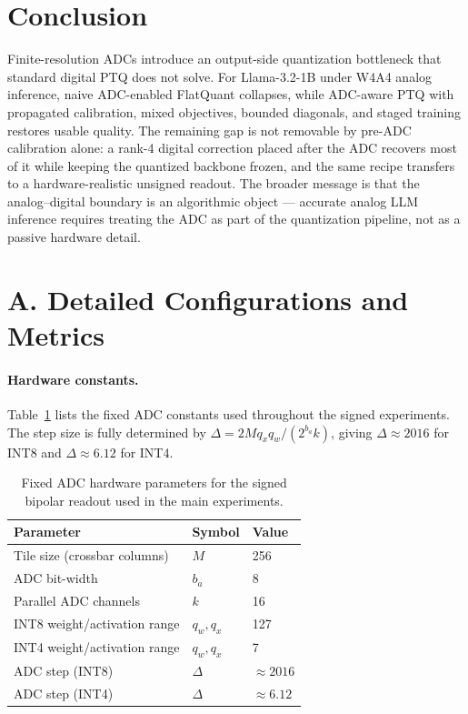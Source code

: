 \documentclass[letterpaper]{article} %
\theoremstyle{plain}
\begin{document}
\section{Conclusion}

Finite-resolution ADCs introduce an output-side quantization bottleneck that standard digital PTQ does not solve. For Llama-3.2-1B under W4A4 analog inference, naive ADC-enabled FlatQuant collapses, while ADC-aware PTQ with propagated calibration, mixed objectives, bounded diagonals, and staged training restores usable quality. The remaining gap is not removable by pre-ADC calibration alone: a rank-4 digital correction placed after the ADC recovers most of it while keeping the quantized backbone frozen, and the same recipe transfers to a hardware-realistic unsigned readout. The broader message is that the analog--digital boundary is an algorithmic object --- accurate analog LLM inference requires treating the ADC as part of the quantization pipeline, not as a passive hardware detail.

\appendix

\section{A. Detailed Configurations and Metrics}

\paragraph{Hardware constants.}
Table~\ref{tab:hardware} lists the fixed ADC constants used throughout the signed experiments. The step size is fully determined by $\Delta = 2Mq_xq_w/(2^{b_a}k)$, giving $\Delta \approx 2016$ for INT8 and $\Delta \approx 6.12$ for INT4.

\begin{table}[htbp]
\centering
\begin{tabular}{@{}lll@{}}
\toprule
\textbf{Parameter} & \textbf{Symbol} & \textbf{Value} \\
\midrule
Tile size (crossbar columns) & $M$ & 256 \\
ADC bit-width                & $b_a$ & 8 \\
Parallel ADC channels        & $k$ & 16 \\
INT8 weight/activation range & $q_w,q_x$ & 127 \\
INT4 weight/activation range & $q_w,q_x$ & 7 \\
ADC step (INT8)              & $\Delta$ & $\approx 2016$ \\
ADC step (INT4)              & $\Delta$ & $\approx 6.12$ \\
\bottomrule
\end{tabular}
\caption{Fixed ADC hardware parameters for the signed bipolar readout used in the main experiments.}
\label{tab:hardware}
\end{table}
\end{document}
